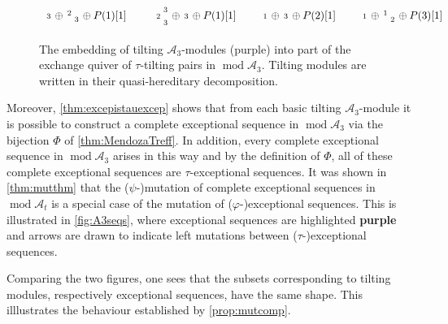 \documentclass[10pt,twoside, a4paper,reqno]{amsart}
\DeclareMathOperator{\mods}{mod}
\newcommand{\A}{\mathscr{A}}
\theoremstyle{definition}
\begin{document}
\begin{figure}[ht!]
\[\begin{tikzcd}[ampersand replacement =\&, column sep=15, row sep = 30]
     \begin{smallmatrix} 3 \end{smallmatrix} \oplus \begin{smallmatrix} 2&\\&3 \end{smallmatrix}\oplus P(1)[1]  \& \begin{smallmatrix} &&3\\&2&\\&&3 \end{smallmatrix} \oplus \begin{smallmatrix} 3 \end{smallmatrix} \oplus P(1)[1] \& \begin{smallmatrix} 1 \end{smallmatrix} \oplus \begin{smallmatrix} 3 \end{smallmatrix} \oplus P(2)[1] \& \begin{smallmatrix} 1 \end{smallmatrix} \oplus \begin{smallmatrix} 1&\\&2 \end{smallmatrix} \oplus P(3)[1]
\end{tikzcd}
\]
    \caption{The embedding of tilting $\A_3$-modules (\color{purple}purple\color{black}) into part of the exchange quiver of $\tau$-tilting pairs in $\mods \A_3$. Tilting modules are written in their quasi-hereditary decomposition.}
    \label{fig:stautiltgraph}
\end{figure}


Moreover, \cref{thm:excepistauexcep} shows that from each basic tilting $\A_3$-module it is possible to construct a complete exceptional sequence in $\mods \A_3$ via the bijection $\Phi$ of \cref{thm:MendozaTreff}. In addition, every complete exceptional sequence in $\mods \A_3$ arises in this way and by the definition of $\Phi$, all of these complete exceptional sequences are $\tau$-exceptional sequences. It was shown in \cref{thm:mutthm} that the ($\psi$-)mutation of complete exceptional sequences in $\mods \A_t$ is a special case of the mutation of ($\varphi$-)exceptional sequences. This is illustrated in \cref{fig:A3seqs}, where exceptional sequences are highlighted {\color{purple} \textbf{purple}} and arrows are drawn to indicate left mutations between ($\tau$-)exceptional sequences.

Comparing the two figures, one sees that the subsets corresponding to tilting modules, respectively exceptional sequences, have the same shape. This illlustrates the behaviour established by \cref{prop:mutcomp}.
\end{document}
